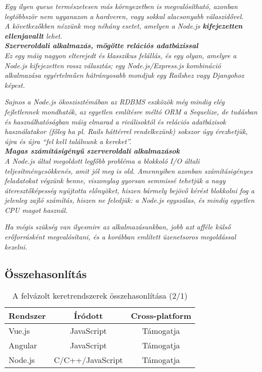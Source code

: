 \textit{Egy ilyen queue természetesen más környezetben is megvalósítható, azonban legtöbbször nem ugyanazon a hardveren, vagy sokkal alacsonyabb válaszidővel.}\\

\textit{A következőkben nézzünk meg néhány esetet, amelyen a Node.js \textbf{kifejezetten ellenjavallt} lehet.}\\

\noindent\textit{\textbf{Szerveroldali alkalmazás, mögötte relációs adatbázissal}}\\

\textit{Ez egy máig nagyon elterejedt és klasszikus felállás, és egy olyan, amelyre a Node.js kifejezetten rossz választás; egy Node.js/Express.js kombináció alkalmazása egyértelműen hátrányosabb mondjuk egy Railshez vagy Djangohoz képest.}

\textit{Sajnos a Node.js ökoszisztémában az RDBMS eszközök még mindig elég fejletlennek mondhatók, az egyetlen említésre méltó ORM a Sequelize, de tudásban és használhatóságban máig elmarad a riválisoktól és relációs adatbázisok használatakor (főleg ha pl. Rails háttérrel rendelkezünk) sokszor úgy érezhetjük, újra és újra “fel kell találnunk a kereket”.}\\

\noindent\textit{\textbf{Magas számításigényű szerveroldali alkalmazások}}\\

\textit{A Node.js által megoldott legfőbb probléma a blokkoló I/O általi teljesítménycsökkenés, amit jól meg is old. Amennyiben azonban számításigényes feladatokat végzünk benne, viszonylag gyorsan semmissé tehetjük a nagy áteresztőképesség nyújtotta előnyöket, hiszen bármely bejövő kérést blokkolni fog a jelenleg zajló számítás, hiszen ne feledjük: a Node.js egyszálas, és mindig egyetlen CPU magot használ.}

\textit{Ha mégis szükség van ilyesmire az alkalmazásunkban, jobb azt afféle külső erőforrásként megvalósítani, és a korábban említett üzenetsoros megoldással kezelni.}


\subsection{Összehasonlítás}

\begin{table}[h]
\centering
\caption{A felvázolt keretrendszerek összehasonlítása (2/1)}
\label{tab:minta}
\begin{tabular}{|l|c|c|}
\hline
Rendszer & Íródott & Cross-platform\\
\hline
Vue.js & JavaScript & Támogatja\\
\hline
Angular & JavaScript & Támogatja\\
\hline
Node.js & C/C++/JavaScript & Támogatja\\
\hline
\end{tabular}
\end{table}


